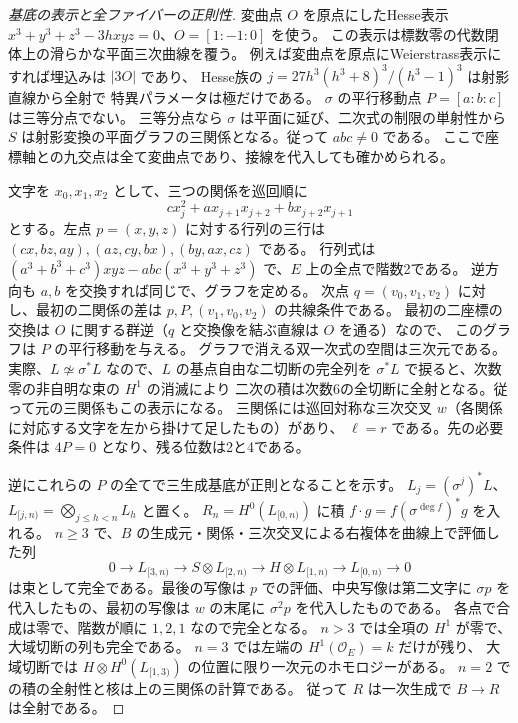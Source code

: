 \begin{proof}[基底の表示と全ファイバーの正則性]
変曲点 $O$ を原点にしたHesse表示
$x^3+y^3+z^3-3hxyz=0$、$O=[1:-1:0]$ を使う。
この表示は標数零の代数閉体上の滑らかな平面三次曲線を覆う。
例えば変曲点を原点にWeierstrass表示にすれば埋込みは $|3O|$ であり、
Hesse族の $j=27h^3(h^3+8)^3/(h^3-1)^3$ は射影直線から全射で
特異パラメータは極だけである\cite[\S7.3]{KLV}。
$\sigma$ の平行移動点 $P=[a:b:c]$ は三等分点でない。
三等分点なら $\sigma$ は平面に延び、二次式の制限の単射性から
$S$ は射影変換の平面グラフの三関係となる。従って $abc\ne0$ である。
ここで座標軸との九交点は全て変曲点であり、接線を代入しても確かめられる。

文字を $x_0,x_1,x_2$ として、三つの関係を巡回順に
\[
          c x_j^2+a x_{j+1}x_{j+2}+b x_{j+2}x_{j+1}
\]
とする。左点 $p=(x,y,z)$ に対する行列の三行は
$(cx,bz,ay),(az,cy,bx),(by,ax,cz)$ である。
行列式は $(a^3+b^3+c^3)xyz-abc(x^3+y^3+z^3)$ で、$E$ 上の全点で階数2である。
逆方向も $a,b$ を交換すれば同じで、グラフを定める。
次点 $q=(v_0,v_1,v_2)$ に対し、最初の二関係の差は
$p,P,(v_1,v_0,v_2)$ の共線条件である。
最初の二座標の交換は $O$ に関する群逆（$q$ と交換像を結ぶ直線は $O$ を通る）なので、
このグラフは $P$ の平行移動を与える。
グラフで消える双一次式の空間は三次元である。
実際、$L\not\simeq\sigma^*L$ なので、$L$ の基点自由な二切断の完全列を
$\sigma^*L$ で捩ると、次数零の非自明な束の $H^1$ の消滅により
二次の積は次数6の全切断に全射となる。従って元の三関係もこの表示になる。
三関係には巡回対称な三次交叉 $w$（各関係に対応する文字を左から掛けて足したもの）があり、
$\ell=r$ である。先の必要条件は $4P=0$ となり、残る位数は2と4である。

逆にこれらの $P$ の全てで三生成基底が正則となることを示す。
$L_j=(\sigma^j)^*L$、$L_{[j,n)}=\bigotimes_{j\le h<n}L_h$ と置く。
$R_n=H^0(L_{[0,n)})$ に積 $f\cdot g=f(\sigma^{\deg f})^*g$ を入れる。
$n\ge3$ で、$B$ の生成元・関係・三次交叉による右複体を曲線上で評価した列
\[
 0\longrightarrow L_{[3,n)}\longrightarrow S\otimes L_{[2,n)}
  \longrightarrow H\otimes L_{[1,n)}\longrightarrow L_{[0,n)}\longrightarrow0
\]
は束として完全である。最後の写像は $p$ での評価、中央写像は第二文字に
$\sigma p$ を代入したもの、最初の写像は $w$ の末尾に $\sigma^2p$ を代入したものである。
各点で合成は零で、階数が順に $1,2,1$ なので完全となる。
$n>3$ では全項の $H^1$ が零で、大域切断の列も完全である。
$n=3$ では左端の $H^1(\mathcal O_E)=k$ だけが残り、
大域切断では $H\otimes H^0(L_{[1,3)})$ の位置に限り一次元のホモロジーがある。
$n=2$ での積の全射性と核は上の三関係の計算である。
従って $R$ は一次生成で $B\to R$ は全射である。


\end{proof}
